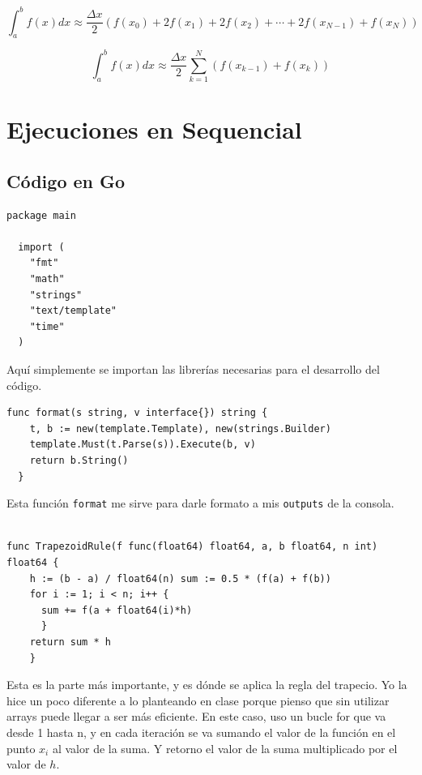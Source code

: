 \documentclass[a4paper]{article}
\begin{document}
\begin{equation}
\int_{a}^{b} f(x) dx \approx \frac{\Delta {x}}{2} (f(x_0) + 2f(x_1) + 2f(x_2) + \cdots + 2f(x_{N-1}) + f(x_N))
\end{equation}



\begin{equation}
\int_{a}^{b} f(x) dx \approx \frac{\Delta{x}}{2} \sum_{k=1}^{N} (f(x_{k-1}) + f(x_{k}))
\end{equation}


\section{Ejecuciones en Sequencial}

\subsection{Código en Go}
\begin{lstlisting}[style=Golang]
  package main

  import (
    "fmt"
    "math"
    "strings"
    "text/template"
    "time"
  )
\end{lstlisting}
Aquí simplemente se importan las librerías necesarias para el desarrollo del código.
\pagebreak

\begin{lstlisting}[style=Golang, firstnumber=11]
  func format(s string, v interface{}) string {
    t, b := new(template.Template), new(strings.Builder)
    template.Must(t.Parse(s)).Execute(b, v)
    return b.String()
  }
\end{lstlisting}
Esta función \texttt{format} me sirve para darle formato a mis \texttt{outputs} de la consola. \\
\\

\begin{lstlisting}[style=Golang, firstnumber=17]
  func TrapezoidRule(f func(float64) float64, a, b float64, n int) float64 {
    h := (b - a) / float64(n) sum := 0.5 * (f(a) + f(b))
    for i := 1; i < n; i++ {
      sum += f(a + float64(i)*h)
      }  
    return sum * h
    }
\end{lstlisting}
Esta es la parte más importante, y es dónde se aplica la regla del trapecio.
Yo la hice un poco diferente a lo planteando en clase porque pienso que sin
utilizar arrays puede llegar a ser más eficiente. En este caso, uso un bucle for
que va desde 1 hasta n, y en cada iteración se va sumando el valor de la función
en el punto $x_i$ al valor de la suma. Y retorno el valor de la suma multiplicado
por el valor de $h$. \\ \\
\end{document}
